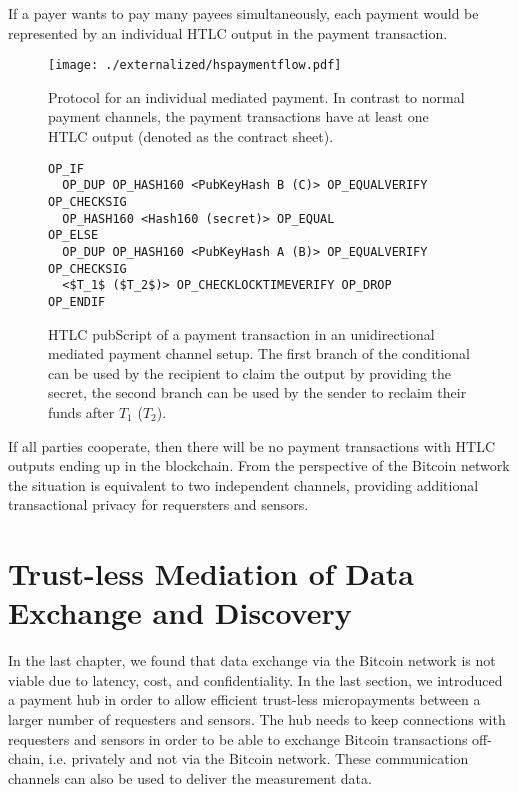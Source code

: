 If a payer wants to pay many payees simultaneously, each payment would be represented by an individual \ac{HTLC} output in the payment transaction.

\begin{figure}
\centering
\texttt{[image: ./externalized/hspaymentflow.pdf]}
\caption{Protocol for an individual mediated payment. In contrast to normal payment channels, the payment transactions have at least one \ac{HTLC} output (denoted as the contract sheet).}
\label{fig:unimedpc}
\end{figure}

\begin{figure}
\begin{lstlisting}[breaklines,mathescape=true]
OP_IF
  OP_DUP OP_HASH160 <PubKeyHash B (C)> OP_EQUALVERIFY OP_CHECKSIG
  OP_HASH160 <Hash160 (secret)> OP_EQUAL
OP_ELSE
  OP_DUP OP_HASH160 <PubKeyHash A (B)> OP_EQUALVERIFY OP_CHECKSIG
  <$T_1$ ($T_2$)> OP_CHECKLOCKTIMEVERIFY OP_DROP
OP_ENDIF
\end{lstlisting} 
\caption{\ac{HTLC} pubScript of a payment transaction in an unidirectional mediated payment channel setup. The first branch of the conditional can be used by the recipient to claim the output by providing the secret, the second branch can be used by the sender to reclaim their funds after $T_1$ ($T_2$).}
\label{fig:pubScriptHTLC}
\end{figure}

If all parties cooperate, then there will be no payment transactions with \ac{HTLC} outputs ending up in the blockchain. From the perspective of the Bitcoin network the situation is equivalent to two independent channels, providing additional transactional privacy for requersters and sensors.

\section{Trust-less Mediation of Data Exchange and Discovery}
\label{sec:trust-lessexchange}

In the last chapter, we found that data exchange via the Bitcoin network is not viable due to latency, cost, and confidentiality. In the last section, we introduced a payment hub in order to allow efficient trust-less micropayments between a larger number of requesters and sensors. The hub needs to keep connections with requesters and sensors in order to be able to exchange Bitcoin transactions off-chain, i.e. privately and not via the Bitcoin network. These communication channels can also be used to deliver the measurement data.

